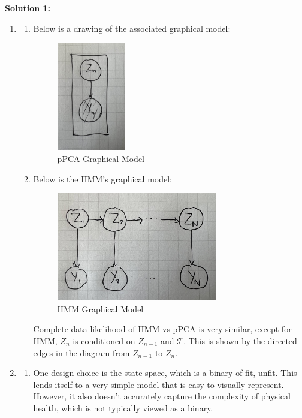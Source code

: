 \documentclass[submit]{harvardml}
\begin{document}
\newpage

\textbf{Solution 1:}

\begin{enumerate}
\item
    \begin{enumerate}
    \item Below is a drawing of the associated graphical model:
    \begin{figure}[h]
        \centering  
        \includegraphics[width=3cm]{hw5/figures/prob1a.jpeg}
        \caption{pPCA Graphical Model}
        \label{fig:prob1a}
    \end{figure}

    \item Below is the HMM's graphical model:
    \begin{figure}[h]
        \centering  
        \includegraphics[width=7cm]{hw5/figures/prob1b.jpeg}
        \caption{HMM Graphical Model}
        \label{fig:prob1b}
    \end{figure}

    Complete data likelihood of HMM vs pPCA is very similar, except for HMM, $Z_n$ is conditioned on $Z_{n-1}$ and $\mathcal{T}$. This is shown by the directed edges in the diagram from $Z_{n-1}$ to $Z_n$.
    \end{enumerate}
\item 
\begin{enumerate}
    \item 
    One design choice is the state space, which is a binary of {fit, unfit}. This lends itself to a very simple model that is easy to visually represent. However, it also doesn't accurately capture the complexity of physical health, which is not typically viewed as a binary.
    

\end{enumerate}
\end{enumerate}
\end{document}

